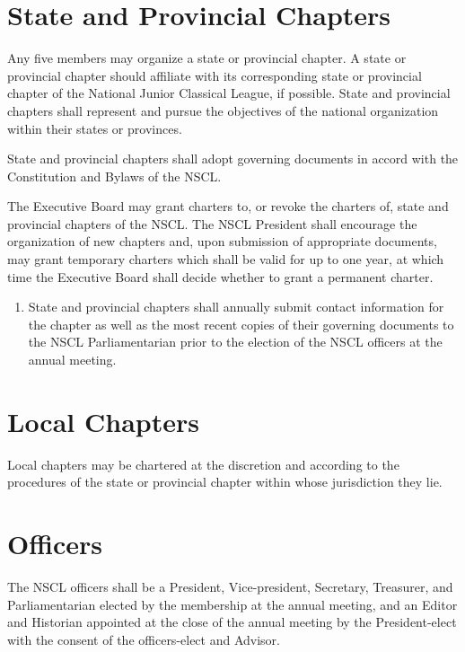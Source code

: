 \documentclass{bylaws_nofont}
\newcommand{\NSCL}{\textsc{NSCL}\xspace}
\begin{document}
\begin{linenumbers}[1]

  \section{State and Provincial Chapters}
  Any five members may organize a state or provincial chapter. A state
  or provincial chapter should affiliate with its corresponding state or
  provincial chapter of the National Junior Classical League, if
  possible. State and provincial chapters shall represent and pursue the
  objectives of the national organization within their states or
  provinces.
  \begin{enumerate}
     State and provincial chapters shall adopt
    governing documents in accord with the Constitution and Bylaws of
    the \NSCL.
    
    \sub[Charters] The Executive Board may grant charters to, or revoke
    the charters of, state and provincial chapters of the \NSCL. The
    \NSCL President shall encourage the organization of new chapters
    and, upon submission of appropriate documents, may grant temporary
    charters which shall be valid for up to one year, at which time the
    Executive Board shall decide whether to grant a permanent charter.
    \begin{enumerate}
    \item State and provincial chapters shall annually submit contact
      information for the chapter as well as the most recent copies of
      their governing documents to the \NSCL Parliamentarian prior to
      the election of the \NSCL officers at the annual meeting.\\
    \end{enumerate}
  \end{enumerate}

  \section{Local Chapters}
  Local chapters may be chartered at the discretion and according to the
  procedures of the state or provincial chapter within whose
  jurisdiction they lie.\\

  
  \section{Officers}
  The \NSCL officers shall be a President, Vice-president, Secretary,
  Treasurer, and Parliamentarian elected by the membership at the annual
  meeting, and an Editor and Historian appointed at the close of the
  annual meeting by the President-elect with the consent of the
  officers-elect and Advisor.\\


\end{linenumbers}
\end{document}
